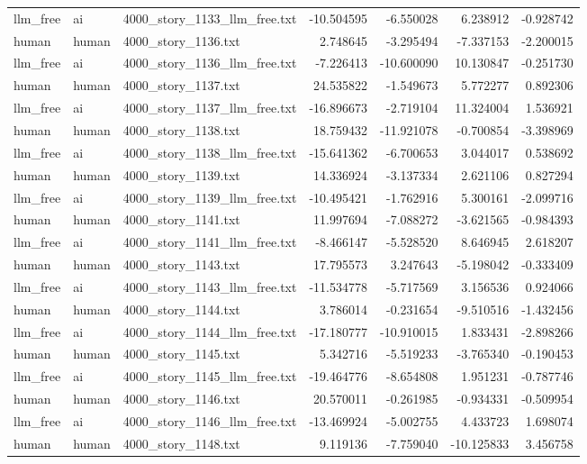 \begin{longtable}{lllrrrr}
llm\_free & ai & 4000\_story\_1133\_llm\_free.txt & -10.504595 & -6.550028 & 6.238912 & -0.928742 \\
human & human & 4000\_story\_1136.txt & 2.748645 & -3.295494 & -7.337153 & -2.200015 \\
llm\_free & ai & 4000\_story\_1136\_llm\_free.txt & -7.226413 & -10.600090 & 10.130847 & -0.251730 \\
human & human & 4000\_story\_1137.txt & 24.535822 & -1.549673 & 5.772277 & 0.892306 \\
llm\_free & ai & 4000\_story\_1137\_llm\_free.txt & -16.896673 & -2.719104 & 11.324004 & 1.536921 \\
human & human & 4000\_story\_1138.txt & 18.759432 & -11.921078 & -0.700854 & -3.398969 \\
llm\_free & ai & 4000\_story\_1138\_llm\_free.txt & -15.641362 & -6.700653 & 3.044017 & 0.538692 \\
human & human & 4000\_story\_1139.txt & 14.336924 & -3.137334 & 2.621106 & 0.827294 \\
llm\_free & ai & 4000\_story\_1139\_llm\_free.txt & -10.495421 & -1.762916 & 5.300161 & -2.099716 \\
human & human & 4000\_story\_1141.txt & 11.997694 & -7.088272 & -3.621565 & -0.984393 \\
llm\_free & ai & 4000\_story\_1141\_llm\_free.txt & -8.466147 & -5.528520 & 8.646945 & 2.618207 \\
human & human & 4000\_story\_1143.txt & 17.795573 & 3.247643 & -5.198042 & -0.333409 \\
llm\_free & ai & 4000\_story\_1143\_llm\_free.txt & -11.534778 & -5.717569 & 3.156536 & 0.924066 \\
human & human & 4000\_story\_1144.txt & 3.786014 & -0.231654 & -9.510516 & -1.432456 \\
llm\_free & ai & 4000\_story\_1144\_llm\_free.txt & -17.180777 & -10.910015 & 1.833431 & -2.898266 \\
human & human & 4000\_story\_1145.txt & 5.342716 & -5.519233 & -3.765340 & -0.190453 \\
llm\_free & ai & 4000\_story\_1145\_llm\_free.txt & -19.464776 & -8.654808 & 1.951231 & -0.787746 \\
human & human & 4000\_story\_1146.txt & 20.570011 & -0.261985 & -0.934331 & -0.509954 \\
llm\_free & ai & 4000\_story\_1146\_llm\_free.txt & -13.469924 & -5.002755 & 4.433723 & 1.698074 \\
human & human & 4000\_story\_1148.txt & 9.119136 & -7.759040 & -10.125833 & 3.456758 \\

\end{longtable}
